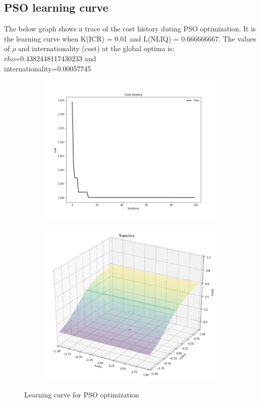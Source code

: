 \documentclass{article}
\begin{document}
\subsection{PSO learning curve}

The below graph shows a trace of the cost history duting PSO optimization. It is the learning curve when K(ICR) = 0.01 and L(NLIQ) = 0.666666667. The values of $\rho$ and internationality (cost) at the global optima is: \\$rho$=0.4382448117430233 and  \\internationality=0.00057745 

\begin{figure}
\begin{subfigure}{.5\textwidth}
  \centering
  \includegraphics[width=.7\linewidth]{images/cost.png}  
  \caption{}
  \label{fig:sub-first}
\end{subfigure}
\hfill
\begin{subfigure}{.5\textwidth}
  \centering
  \includegraphics[width=.7\linewidth]{images/cost_opt.png}  
  \caption{}
  \label{fig:sub-second}
\end{subfigure}
\caption{Learning curve for PSO optimization}
\label{fig:fig}
\end{figure}
\end{document}
